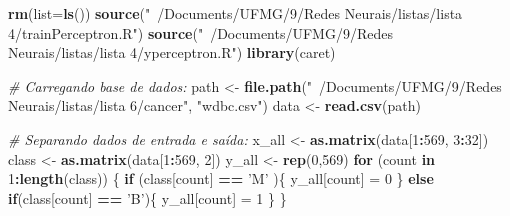 \documentclass[
]{article}
\newenvironment{Shaded}{\begin{snugshade}}{\end{snugshade}}
\newcommand{\CommentTok}[1]{\textcolor[rgb]{0.56,0.35,0.01}{\textit{#1}}}
\newcommand{\ControlFlowTok}[1]{\textcolor[rgb]{0.13,0.29,0.53}{\textbf{#1}}}
\newcommand{\DataTypeTok}[1]{\textcolor[rgb]{0.13,0.29,0.53}{#1}}
\newcommand{\DecValTok}[1]{\textcolor[rgb]{0.00,0.00,0.81}{#1}}
\newcommand{\KeywordTok}[1]{\textcolor[rgb]{0.13,0.29,0.53}{\textbf{#1}}}
\newcommand{\NormalTok}[1]{#1}
\newcommand{\OperatorTok}[1]{\textcolor[rgb]{0.81,0.36,0.00}{\textbf{#1}}}
\newcommand{\StringTok}[1]{\textcolor[rgb]{0.31,0.60,0.02}{#1}}
\begin{document}
\begin{Shaded}
\begin{Highlighting}[]
\KeywordTok{rm}\NormalTok{(}\DataTypeTok{list=}\KeywordTok{ls}\NormalTok{())}
\KeywordTok{source}\NormalTok{(}\StringTok{"~/Documents/UFMG/9/Redes Neurais/listas/lista 4/trainPerceptron.R"}\NormalTok{)}
\KeywordTok{source}\NormalTok{(}\StringTok{"~/Documents/UFMG/9/Redes Neurais/listas/lista 4/yperceptron.R"}\NormalTok{)}
\KeywordTok{library}\NormalTok{(caret)}

\CommentTok{# Carregando base de dados:}
\NormalTok{path <-}\StringTok{ }\KeywordTok{file.path}\NormalTok{(}\StringTok{"~/Documents/UFMG/9/Redes Neurais/listas/lista 6/cancer"}\NormalTok{, }\StringTok{"wdbc.csv"}\NormalTok{)}
\NormalTok{data <-}\StringTok{ }\KeywordTok{read.csv}\NormalTok{(path)}

\CommentTok{# Separando dados de entrada e saída:}
\NormalTok{x_all <-}\StringTok{ }\KeywordTok{as.matrix}\NormalTok{(data[}\DecValTok{1}\OperatorTok{:}\DecValTok{569}\NormalTok{, }\DecValTok{3}\OperatorTok{:}\DecValTok{32}\NormalTok{])}
\NormalTok{class <-}\StringTok{ }\KeywordTok{as.matrix}\NormalTok{(data[}\DecValTok{1}\OperatorTok{:}\DecValTok{569}\NormalTok{, }\DecValTok{2}\NormalTok{])}
\NormalTok{y_all <-}\StringTok{ }\KeywordTok{rep}\NormalTok{(}\DecValTok{0}\NormalTok{,}\DecValTok{569}\NormalTok{)}
\ControlFlowTok{for}\NormalTok{ (count }\ControlFlowTok{in} \DecValTok{1}\OperatorTok{:}\KeywordTok{length}\NormalTok{(class)) \{}
  \ControlFlowTok{if}\NormalTok{ (class[count] }\OperatorTok{==}\StringTok{ 'M'}\NormalTok{ )\{}
\NormalTok{    y_all[count] =}\StringTok{ }\DecValTok{0}
\NormalTok{  \}}
  \ControlFlowTok{else} \ControlFlowTok{if}\NormalTok{(class[count] }\OperatorTok{==}\StringTok{ 'B'}\NormalTok{)\{}
\NormalTok{    y_all[count] =}\StringTok{ }\DecValTok{1}
\NormalTok{  \}}
\NormalTok{\}}


\end{Highlighting}
\end{Shaded}
\end{document}
